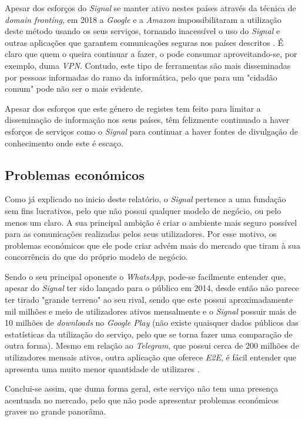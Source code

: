 Apesar dos esforços do \textit{Signal} se manter ativo nestes países através da técnica de \textit{domain fronting}, em 2018 a \textit{Google} e a \textit{Amazon} impossibilitaram a utilização deste método usando os seus serviços, tornando inacessível o uso do \textit{Signal} e outras aplicações que garantem comunicações seguras nos países descritos \cite{signal_amazon_letter}. É claro que quem o queira continuar a fazer, o pode consumar aproveitando-se, por exemplo, duma \textit{VPN}. Contudo, este tipo de ferramentas são mais disseminadas por pessoas informadas do ramo da informática, pelo que para um "cidadão comum" pode não ser o mais evidente.

Apesar dos esforços que este género de registes tem feito para limitar a disseminação de informação nos seus países, têm felizmente continuado a haver esforços de serviços como o \textit{Signal} para continuar a haver fontes de divulgação de conhecimento onde este é escaço.


\subsection{Problemas económicos}
Como já explicado no inicio deste relatório, o \textit{Signal} pertence a uma fundação sem fins lucrativos, pelo que não possui qualquer modelo de negócio, ou pelo menos um claro. A sua principal ambição é criar o ambiente mais seguro possível para as comunicações realizadas pelos seus utilizadores. Por esse motivo, os problemas económicos que ele pode criar advém mais do mercado que tiram à sua concorrência do que do próprio modelo de negócio.

Sendo o seu principal oponente o \textit{WhatsApp}, pode-se facilmente entender que, apesar do \textit{Signal} ter sido lançado para o público em 2014, desde então não parece ter tirado "grande terreno" ao seu rival, sendo que este possui aproximadamente mil milhões e meio de utilizadores ativos mensalmente e o \textit{Signal} possuir mais de 10 milhões de \textit{downloads} no \textit{Google Play} (não existe quaisquer dados públicos das estatísticas da utilização do serviço, pelo que se torna fazer uma comparação de outra forma). Mesmo em relação ao \textit{Telegram}, que possui cerca de 200 milhões de utilizadores mensais ativos, outra aplicação que oferece \textit{E2E}, é fácil entender que apresenta uma muito menor quantidade de utilizares \cite{other_apps_statistics}. 

Conclui-se assim, que duma forma geral, este serviço não tem uma presença acentuada no mercado, pelo que não pode apresentar problemas económicos graves no grande panorâma.

